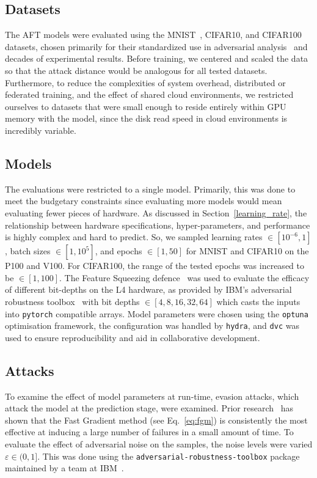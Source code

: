 \documentclass[sn-mathphys-num]{sn-jnl}%
\begin{document}
\subsection{Datasets}

The AFT models were evaluated using the MNIST~\cite{mnist}, CIFAR10\cite{cifar}, and CIFAR100\cite{cifar} datasets, chosen primarily for their standardized use in adversarial analysis~\cite{madry2017towards,croce_reliable_2020,carlini_towards_2017,deepfool} and decades of experimental results.
Before training, we centered and scaled the data so that the attack distance would be analogous for all tested datasets. Furthermore, to reduce the complexities of system overhead, distributed or federated training, and the effect of shared cloud environments, we restricted ourselves to datasets that were small enough to reside entirely within GPU memory with the model, since the disk read speed in cloud environments is incredibly variable.


\subsection{Models}

The evaluations were restricted to a single model. Primarily, this was done to meet the budgetary constraints since evaluating more models would mean evaluating fewer pieces of hardware. As discussed in Section~\ref{learning_rate}, the relationship between hardware specifications, hyper-parameters, and performance is highly complex and hard to predict. So, we sampled learning rates $\in [10^{-6}, 1]$, batch sizes $\in [1, 10^5]$, and epochs $\in [1, 50]$ for MNIST and CIFAR10 on the P100 and V100. For CIFAR100, the range of the tested epochs was increased to be $\in [1, 100]$. The Feature Squeezing defence~\cite{feature_squeezing} was used to evaluate the efficacy of different bit-depths on the L4 hardware, as provided by IBM's adversarial robustness toolbox~\cite{art2018} with bit depths $\in [4,8,16,32,64]$ which casts the inputs into \texttt{pytorch} compatible arrays. Model parameters were chosen using the \texttt{optuna} optimisation framework, the configuration was handled by \texttt{hydra}, and \texttt{dvc} was used to ensure reproducibility and aid in collaborative development.


\subsection{Attacks}

To examine the effect of model parameters at run-time, evasion attacks, which attack the model at the prediction stage, were examined. Prior research~\cite{meyers,meyers_aft} has shown that the Fast Gradient method (see Eq.~\ref{eq:fgm}) is consistently the most effective at inducing a large number of failures in a small amount of time. To evaluate the effect of adversarial noise on the samples, the noise levels were varied $\varepsilon \in (0, 1]$. This was done using the \texttt{adversarial-robustness-toolbox} package maintained by a team at IBM~\cite{art2018}.
\end{document}

